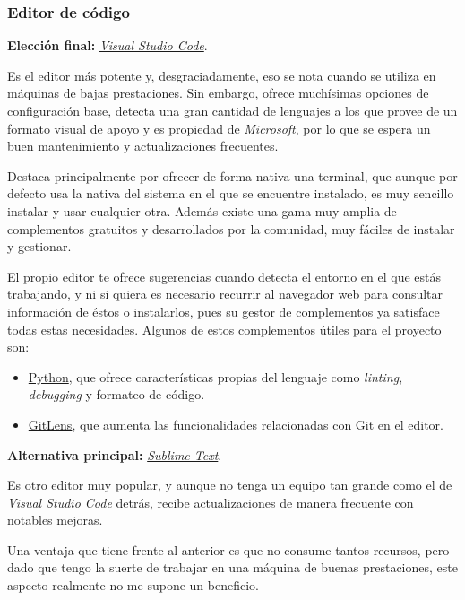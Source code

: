 \subsubsection{Editor de código}

\textbf{Elección final:} \href{https://code.visualstudio.com/}{\textit{Visual Studio Code}}.

Es el editor más potente y, desgraciadamente, eso se nota cuando se utiliza en máquinas de bajas prestaciones. Sin embargo, ofrece muchísimas opciones de configuración base, detecta una gran cantidad de lenguajes a los que provee de un formato visual de apoyo y es propiedad de \textit{Microsoft}, por lo que se espera un buen mantenimiento y actualizaciones frecuentes.

Destaca principalmente por ofrecer de forma nativa una terminal, que aunque por defecto usa la nativa del sistema en el que se encuentre instalado, es muy sencillo instalar y usar cualquier otra. Además existe una gama muy amplia de complementos gratuitos y desarrollados por la comunidad, muy fáciles de instalar y gestionar. 

El propio editor te ofrece sugerencias cuando detecta el entorno en el que estás trabajando, y ni si quiera es necesario recurrir al navegador web para consultar información de éstos o instalarlos, pues su gestor de complementos ya satisface todas estas necesidades. Algunos de estos complementos útiles para el proyecto son:
\begin{itemize}
    \item \href{https://marketplace.visualstudio.com/items?itemName=ms-python.python}{Python}, que ofrece características propias del lenguaje como \textit{linting}, \textit{debugging} y formateo de código.
    \item \href{https://marketplace.visualstudio.com/items?itemName=eamodio.gitlens}{GitLens}, que aumenta las funcionalidades relacionadas con Git en el editor.
\end{itemize}

\textbf{Alternativa principal:} \href{https://www.sublimetext.com/}{\textit{Sublime Text}}.

Es otro editor muy popular, y aunque no tenga un equipo tan grande como el de \textit{Visual Studio Code} detrás, recibe actualizaciones de manera frecuente con notables mejoras.

Una ventaja que tiene frente al anterior es que no consume tantos recursos, pero dado que tengo la suerte de trabajar en una máquina de buenas prestaciones, este aspecto realmente no me supone un beneficio.

